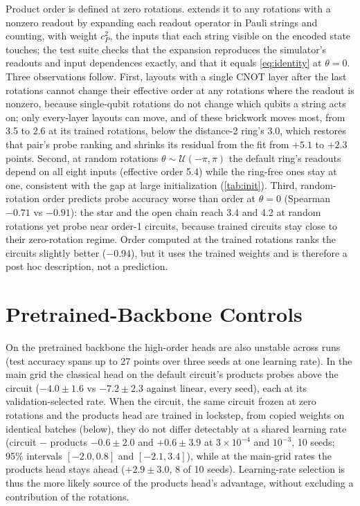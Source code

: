 Product order is defined at zero rotations.  extends it to any rotations with a nonzero readout by
expanding each readout operator in Pauli strings and counting, with weight $c_P^2$, the inputs
that each string visible on the encoded state touches; the test suite checks that the expansion
reproduces the simulator's readouts and input dependences exactly, and that it equals
\cref{eq:identity} at $\theta=0$. Three observations follow. First, layouts with a single
CNOT layer after the last rotations cannot change their effective order at any rotations where the readout is nonzero,
because single-qubit rotations do not change which qubits a string acts on; only every-layer
layouts can move, and of these brickwork moves most, from 3.5 to 2.6 at its trained rotations,
below the distance-2 ring's 3.0, which restores that pair's probe ranking and shrinks its
residual from the fit from $+5.1$ to $+2.3$ points. Second, at random rotations
$\theta\sim\mathcal{U}(-\pi,\pi)$ the default ring's readouts depend on all eight inputs
(effective order 5.4) while the ring-free ones stay at one, consistent with the gap at large
initialization (\cref{tab:init}). Third, random-rotation order predicts probe accuracy worse than
order at $\theta=0$ (Spearman $-0.71$ vs $-0.91$): the star and the open chain reach 3.4 and 4.2
at random rotations yet probe near order-1 circuits, because trained circuits stay close to their
zero-rotation regime. Order computed at the trained rotations ranks the circuits slightly better
($-0.94$), but it uses the trained weights and is therefore a post hoc description, not a
prediction.

\section{Pretrained-Backbone Controls}
\label{app:ptcontrols}

On the pretrained backbone the high-order heads are also unstable across runs (test accuracy spans up to 27 points
over three seeds at one learning rate). In the
main grid the classical head on the default circuit's products probes above the circuit
($-4.0\pm1.6$ vs $-7.2\pm2.3$ against linear, every seed), each at its validation-selected
rate. When the circuit, the same circuit frozen at zero rotations and the products head are
trained in lockstep, from copied weights on identical batches (below), they
do not differ detectably at a shared learning rate (circuit $-$ products $-0.6\pm2.0$ and $+0.6\pm3.9$ at
$3\times10^{-4}$ and $10^{-3}$, 10 seeds; 95\% intervals $[-2.0,0.8]$ and $[-2.1,3.4]$), while at
the main-grid rates the products head stays ahead ($+2.9\pm3.0$, 8 of 10 seeds). Learning-rate
selection is thus the more likely source of the products head's advantage, without excluding
a contribution of the rotations.


